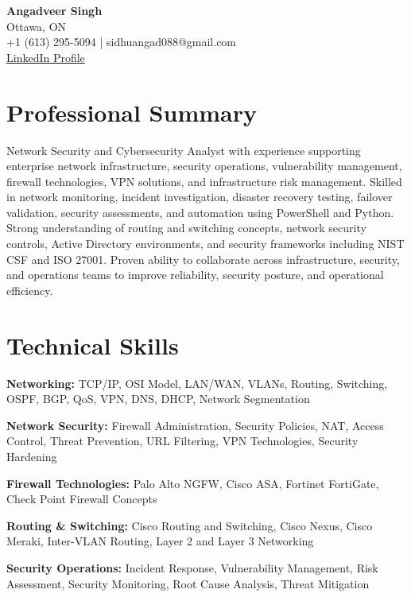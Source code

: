 \documentclass[11pt,a4paper]{article}
\begin{document}
\begin{center}
{\LARGE \textbf{Angadveer Singh}}\\
Ottawa, ON \\
+1 (613) 295-5094 \quad | \quad sidhuangad088@gmail.com \\
\href{https://www.linkedin.com/in/angadveer-singh-46a57916a}{LinkedIn Profile}
\end{center}

\vspace{-0.3cm}

\section*{Professional Summary}

Network Security and Cybersecurity Analyst with experience supporting enterprise network infrastructure, security operations, vulnerability management, firewall technologies, VPN solutions, and infrastructure risk management. Skilled in network monitoring, incident investigation, disaster recovery testing, failover validation, security assessments, and automation using PowerShell and Python. Strong understanding of routing and switching concepts, network security controls, Active Directory environments, and security frameworks including NIST CSF and ISO 27001. Proven ability to collaborate across infrastructure, security, and operations teams to improve reliability, security posture, and operational efficiency.

\section*{Technical Skills}

\textbf{Networking:}
TCP/IP, OSI Model, LAN/WAN, VLANs, Routing, Switching, OSPF, BGP, QoS, VPN, DNS, DHCP, Network Segmentation

\textbf{Network Security:}
Firewall Administration, Security Policies, NAT, Access Control, Threat Prevention, URL Filtering, VPN Technologies, Security Hardening

\textbf{Firewall Technologies:}
Palo Alto NGFW, Cisco ASA, Fortinet FortiGate, Check Point Firewall Concepts

\textbf{Routing \& Switching:}
Cisco Routing and Switching, Cisco Nexus, Cisco Meraki, Inter-VLAN Routing, Layer 2 and Layer 3 Networking

\textbf{Security Operations:}
Incident Response, Vulnerability Management, Risk Assessment, Security Monitoring, Root Cause Analysis, Threat Mitigation
\end{document}
